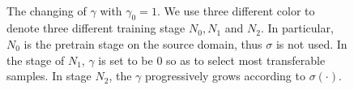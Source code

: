 \begin{figure}[!t]
    \centering
    \\
    \hspace{0mm}
    \caption{
        The changing of $\gamma$ with $\gamma_0=1$. 
        We use three different color to denote three different training stage $N_0, N_1$ and $N_2$. 
        In particular, $N_0$ is the pretrain stage on the source domain, thus $\sigma$ is not used. 
        In the stage of $N_1$, $\gamma$ is set to be $0$ so as to select most transferable samples. 
        In stage $N_2$, the $\gamma$ progressively grows according to $\sigma(\cdot)$.
    }
    \label{figure: offset changing}
\end{figure}